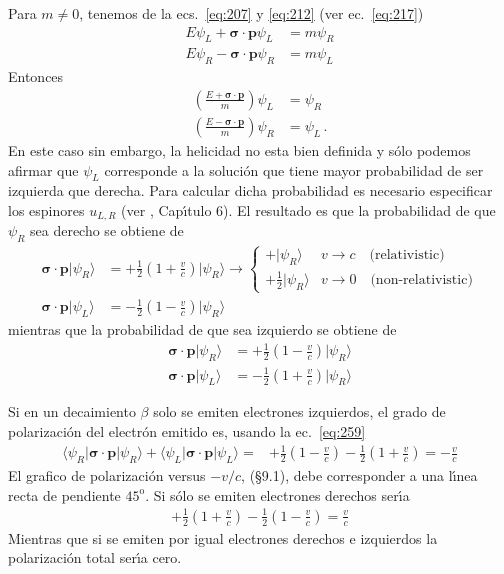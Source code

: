 \begin{subappendices}
Para $m\neq0$, tenemos de la ecs.~\eqref{eq:207} y \eqref{eq:212} (ver ec.~\eqref{eq:217})
\begin{align}
  E\psi_L+\boldsymbol{\sigma}\cdot\mathbf{p}\psi_L &=m\psi_R\nonumber\\
  E\psi_R-\boldsymbol{\sigma}\cdot\mathbf{p}\psi_R&=m\psi_L
\end{align}
Entonces
\begin{align}
  \label{eq:219}
  \left(\frac{E+\boldsymbol{\sigma}\cdot\mathbf{p}}{m}\right)\psi_L&=\psi_R\nonumber\\
  \left(\frac{E-\boldsymbol{\sigma}\cdot\mathbf{p}}{m}\right)\psi_R&=\psi_L\,.
\end{align}
En este caso sin embargo, la helicidad no esta bien definida y s\'olo podemos afirmar que $\psi_L$ corresponde a la soluci\'on que tiene mayor probabilidad de ser izquierda que derecha. Para calcular dicha probabilidad es necesario especificar los espinores $u_{L,R}$ (ver \cite{cottingham}, Cap\'\i tulo 6). El resultado es que la probabilidad de que $\psi_{R}$ sea derecho se obtiene de
\begin{align}
  \boldsymbol{\sigma}\cdot\mathbf{p}|\psi_{R}\rangle&=+\frac{1}{2}\left(1+\frac{v}{c}\right)|\psi_{R}\rangle\to 
  \begin{cases}
    +|\psi_{R}\rangle & v\to c\quad\text{(relativistic)}\\
    +\frac{1}{2}|\psi_{R}\rangle & v\to 0 \quad\text{(non-relativistic)}
  \end{cases}\nonumber\\
  \boldsymbol{\sigma}\cdot\mathbf{p}|\psi_{L}\rangle&=-\frac{1}{2}\left(1-\frac{v}{c}\right)|\psi_{R}\rangle
\end{align}
mientras que la probabilidad de que sea izquierdo se obtiene de
\begin{align}
\label{eq:259}
  \boldsymbol{\sigma}\cdot\mathbf{p}|\psi_{R}\rangle&=+\frac{1}{2}\left(1-\frac{v}{c}\right)|\psi_{R}\rangle\nonumber\\
  \boldsymbol{\sigma}\cdot\mathbf{p}|\psi_{L}\rangle&=-\frac{1}{2}\left(1+\frac{v}{c}\right)|\psi_{R}\rangle
\end{align}

Si en un decaimiento $\beta$ solo se emiten electrones izquierdos, el grado de polarizaci\'on del electr\'on emitido es, usando la ec.~\eqref{eq:259}
\begin{align}
   \langle \psi_R|\boldsymbol{\sigma}\cdot\mathbf{p}|\psi_R\rangle+ \langle \psi_L|\boldsymbol{\sigma}\cdot\mathbf{p}|\psi_L\rangle
=&+\frac{1}{2}\left(1-\frac{v}{c}\right)-\frac{1}{2}\left(1+\frac{v}{c}\right)=-\frac{v}{c}
\end{align}
El grafico de polarizaci\'on versus $-v/c$, \cite{cottingham} (\S9.1), debe corresponder a una l\'\i nea recta de pendiente $45^\text{o}$. Si s\'olo se emiten electrones derechos ser\'\i a
\begin{align}
  +\frac{1}{2}\left(1+\frac{v}{c}\right)-\frac{1}{2}\left(1-\frac{v}{c}\right)=\frac{v}{c}
\end{align}
Mientras que si se emiten por igual electrones derechos e izquierdos la polarizaci\'on total ser\'\i a cero.


\end{subappendices}
